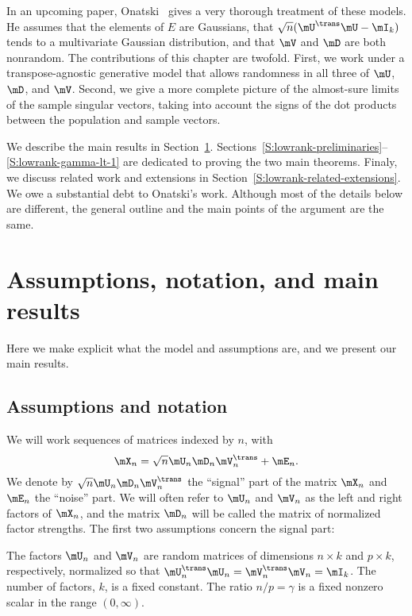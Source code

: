 In an upcoming paper, Onatski~\cite{onatski2009} gives a very thorough
treatment of these models. He assumes that the elements of $E$ are \iid
Gaussians, that $\sqrt{n} ( \mU^\trans \mU - \mI_k) $ tends to a multivariate
Gaussian distribution, and that $\mV$ and $\mD$ are both nonrandom. The
contributions of this chapter are twofold. First, we work under a
transpose-agnostic generative model that allows randomness in all three of
$\mU$, $\mD$, and $\mV$. Second, we give a more complete picture of the
almost-sure limits of the sample singular vectors, taking into account the
signs of the dot products between the population and sample vectors.

We describe the main results in Section~\ref{S:lowrank-assumptions-results}.
Sections~\ref{S:lowrank-preliminaries}--\ref{S:lowrank-gamma-lt-1} are dedicated to proving the two main theorems.  Finaly, we discuss related work and extensions in Section~\ref{S:lowrank-related-extensions}.  We owe a substantial debt to Onatski's work.  Although most of the details below are different, the general outline and the main points of the argument are the same.

\section{Assumptions, notation, and main results}\label{S:lowrank-assumptions-results}

Here we make explicit what the model and assumptions are, and we present our
main results.

\subsection{Assumptions and notation}

We will work sequences of matrices indexed by $n$, with
\[
    \mX_n = \sqrt{n} \mU_n \mD_n \mV_n^\trans + \mE_n.
\]
We denote by $\sqrt{n} \mU_n \mD_n \mV_n^\trans$ the ``signal'' part of the
matrix $\mX_n$ and $\mE_n$ the ``noise'' part. We will often refer to $\mU_n$
and $\mV_n$ as the left and right factors of $\mX_n$, and the matrix $\mD_n$
will be called the matrix of normalized factor strengths. The first two
assumptions concern the signal part:

\begin{assumption}\label{A:factors}
    The factors $\mU_n$ and $\mV_n$ are random matrices of dimensions
    $n \times k$ and $p \times k$, respectively, normalized so that
    $\mU_n^\trans \mU_n =  \mV_n^\trans \mV_n = \mI_k$. 
    The number of factors, $k$, is a fixed constant.  The ratio 
    $n/p = \gamma$ is a fixed nonzero scalar in the range $(0,\infty)$.
\end{assumption}
\noindent

